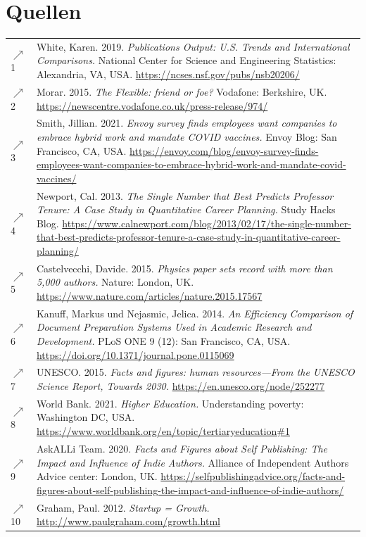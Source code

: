 \documentclass[11pt, a4paper]{article}
\let\oldsection\section
\renewcommand\section{\clearpage\oldsection}
\begin{document}
\section*{Quellen}
\begin{tabular}{l p{}}
    $\nearrow$ 1 & White, Karen. 2019. \emph{Publications Output: U.S. Trends and International Comparisons.} National Center for Science and Engineering Statistics: Alexandria, VA, USA. \url{https://ncses.nsf.gov/pubs/nsb20206/} \\
    $\nearrow$ 2 & Morar. 2015. \emph{The Flexible: friend or foe?} Vodafone: Berkshire, UK. \url{https://newscentre.vodafone.co.uk/press-release/974/} \\
    $\nearrow$ 3 & Smith, Jillian. 2021. \emph{Envoy survey finds employees want companies to embrace hybrid work and mandate COVID vaccines.} Envoy Blog: San Francisco, CA, USA. \url{https://envoy.com/blog/envoy-survey-finds-employees-want-companies-to-embrace-hybrid-work-and-mandate-covid-vaccines/} \\
    $\nearrow$ 4 & Newport, Cal. 2013. \emph{The Single Number that Best Predicts Professor Tenure: A Case Study in Quantitative Career Planning.} Study Hacks Blog. \url{https://www.calnewport.com/blog/2013/02/17/the-single-number-that-best-predicts-professor-tenure-a-case-study-in-quantitative-career-planning/} \\
    $\nearrow$ 5 & Castelvecchi, Davide. 2015. \emph{Physics paper sets record with more than 5,000 authors.} Nature: London, UK. \url{https://www.nature.com/articles/nature.2015.17567} \\
    $\nearrow$ 6 & Kanuff, Markus und Nejasmic, Jelica. 2014. \emph{An Efficiency Comparison of Document Preparation Systems Used in Academic Research and Development.} PLoS ONE 9 (12): San Francisco, CA, USA. \url{https://doi.org/10.1371/journal.pone.0115069} \\
    $\nearrow$ 7 & UNESCO. 2015. \emph{Facts and figures: human resources---From the UNESCO Science Report, Towards 2030.} \url{https://en.unesco.org/node/252277} \\
    $\nearrow$ 8 & World Bank. 2021. \emph{Higher Education.} Understanding poverty: Washington DC, USA. \url{https://www.worldbank.org/en/topic/tertiaryeducation#1} \\
    $\nearrow$ 9 & AskALLi Team. 2020. \emph{Facts and Figures about Self Publishing: The Impact and Influence of Indie Authors.} Alliance of Independent Authors Advice center: London, UK. \url{https://selfpublishingadvice.org/facts-and-figures-about-self-publishing-the-impact-and-influence-of-indie-authors/} \\
    $\nearrow$ 10 & Graham, Paul. 2012. \emph{Startup = Growth.} \url{http://www.paulgraham.com/growth.html} \\
\end{tabular}
\end{document}
